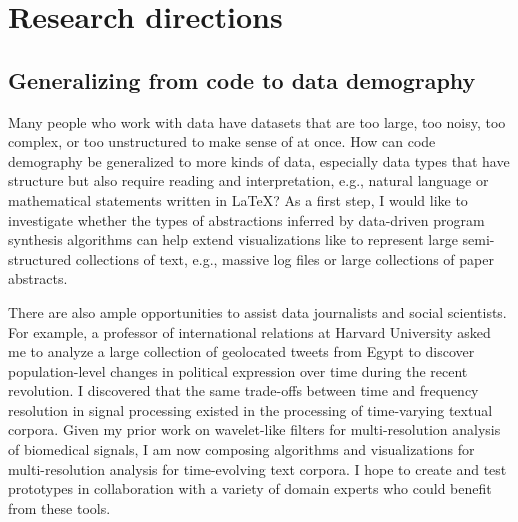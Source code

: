 \documentclass[justified]{tufte-handout}
\begin{document}
\section{Research directions}


\subsection{Generalizing from code to data demography}

Many people who work with data have datasets that are too large, too noisy, too complex, or too unstructured to make sense of at once. How can code demography be generalized to more kinds of data, especially data types that have structure but also require reading and interpretation, e.g., natural language or mathematical statements written in \LaTeX{}?
As a first step, I would like to investigate whether the types of abstractions inferred by data-driven program synthesis algorithms can help extend visualizations like  to represent large semi-structured collections of text, e.g., massive log files or large collections of paper abstracts.  

There are also ample opportunities to assist data journalists and social scientists. For example, a professor of international relations at Harvard University asked me to analyze a large collection of geolocated tweets from Egypt to discover population-level changes in political expression over time during the recent revolution. 
I discovered that the same trade-offs between time and frequency resolution in signal processing existed in the processing of time-varying textual corpora.
Given my prior work on wavelet-like filters for multi-resolution analysis of biomedical signals,\cite{snap} I am now composing algorithms and visualizations for multi-resolution analysis for time-evolving text corpora. I hope to create and test prototypes in collaboration with a variety of domain experts who could benefit from these tools.

\end{document}
